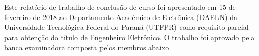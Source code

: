 % 
%
\begin{approvalsheet}

	\begin{center}
		\begin{center}
			\MakeUppercase{\printauthorone} \\
			\MakeUppercase{\printauthortwo} \\
		\end{center}

		\vspace*{\fill}\vspace*{\fill}
		\begin{center}
			\ABNTEXchapterfont\bfseries\Large\imprimirtitulo
		\end{center}
		\vspace*{\fill}

		Este relatório de trabalho de conclusão de curso foi apresentado em 15 de fevereiro
		de 2018 ao Departamento Acadêmico de Eletrônica (DAELN) da Universidade Tecnológica
		Federal do Paraná (UTFPR) como requisito parcial para obtenção do título de Engenheiro
		Eletrônico. O trabalho foi aprovado pela banca examinadora composta pelos membros abaixo
		\vspace*{\fill}
	\end{center}

	\signature{\textbf{Gustavo Borba (DAELN - UTFPR)} \\ Advisor}
	\signature{\textbf{\printcoadvisor} \\ Co-advisor}
	\signature{\textbf{Leonardo Gomes Tavares (Universidade Positivo - UP)}}
	\signature{\textbf{Ricardo Pedroni (DAELN - UTFPR)}}

  \vspace*{\fill}
\end{approvalsheet}
